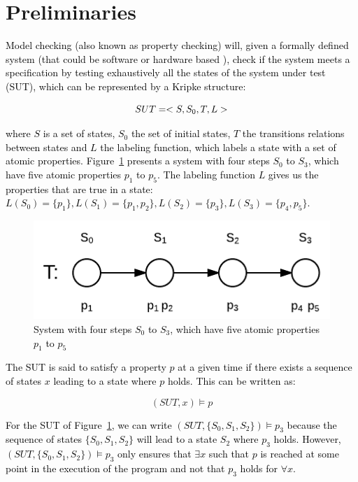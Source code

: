 \documentclass[times, doublespace]{smrauth}
\newcommand{\red}[1]{\textcolor{black}{#1}}
\begin{document}
\section{Preliminaries\label{sec:prelimenaries}}

\red{Model checking (also known as property checking) will, given a formally defined system
(that could be software \cite{Visser2003} or hardware based
\cite{kropf1999introduction}), check if the system meets a specification
by testing exhaustively all the states of the system under test (SUT),
which can be represented by a Kripke \cite{Kripke1963} structure:}

\begin{equation}
\red{SUT = <S, S_0, T, L>}
\end{equation}

\noindent \red{where $S$ is a set of states, $S_0$ the set of initial states, $T$ the transitions relations between states and $L$ the labeling function, which labels a state with a set of atomic properties.
Figure~\ref{fig:mc-def} presents a system with four steps $S_0$ to $S_3$, which have five atomic properties $p_1$ to $p_5$.
The labeling function $L$ gives us the properties that are true in a state: $L(S_0) = \{p_1\}, L(S_1) = \{p_1, p_2\}, L(S_2) = \{p_3\}, L(S_3) = \{p_4, p_5\}$.}

\begin{figure}[h!]
  \centering
    \includegraphics[scale=0.4]{media/mc-def.png}
    \caption{\red{System with four steps $S_0$ to $S_3$, which have five atomic properties $p_1$ to $p_5$}
    \label{fig:mc-def}}
\end{figure}


\red{The SUT is said to satisfy a property $p$ at a given time if there exists a sequence of states $x$ leading to a state where $p$ holds.
This can be written as:}

\begin{equation}
(SUT, x) \models p
\end{equation}

\red{For the SUT of Figure~\ref{fig:mc-def}, we can write $(SUT, \{S_0, S_1, S_2\}) \models p_3$ because the sequence of states $\{S_0, S_1, S_2\}$ will lead to a state $S_2$ where $p_3$ holds. However, $(SUT, \{S_0, S_1, S_2\}) \models p_3$ only ensures that $\exists x$ such that $p$ is reached
at some point in the execution of the program and not that $p_3$ holds
for $\forall x$.}
\end{document}
